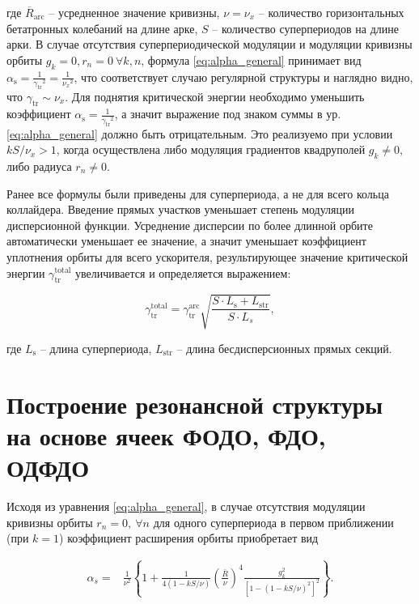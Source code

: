 \noindent где ${\overline{R}}_{\text{arc}}$ -- усредненное значение кривизны, $\nu=\nu_{x}$ -- количество горизонтальных бетатронных колебаний на длине арке, $S$ -- количество суперпериодов на длине арки. В случае отсутствия суперпериодической модуляции и модуляции кривизны орбиты $g_k=0, r_n=0 \  \forall k,n$, формула \ref{eq:alpha_general} принимает вид $\alpha_{\text{s}}=\frac{1}{{\gamma_{\text{tr}}}^2}=\frac{1}{{\nu_x}^2}$, что соответствует случаю регулярной структуры и наглядно видно, что  $\gamma_{\text{tr}}\sim\nu_x$. Для поднятия критической энергии необходимо уменьшить коэффициент $\alpha_{\text{s}}=\frac{1}{{\gamma_{\text{tr}}}^2}$, а значит выражение под знаком суммы в ур.\ref{eq:alpha_general} должно быть отрицательным. Это реализуемо при условии $kS/\nu_{x}>1$, когда осуществлена либо модуляция градиентов квадруполей $g_k\not=0$, либо радиуса $r_n\not=0$.

\par Ранее все формулы были приведены для суперпериода, а не для всего кольца коллайдера. Введение прямых участков уменьшает степень модуляции дисперсионной функции. Усреднение дисперсии по более длинной орбите автоматически уменьшает ее значение, а значит уменьшает коэффициент уплотнения орбиты для всего ускорителя, результирующее значение критической энергии $\gamma_{\text{tr}}^{\text{total}}$ увеличивается и определяется выражением:

\begin{equation}
\gamma_{\text{tr}}^{\text{total}}=\gamma_{\text{tr}}^{\text{arc}}\sqrt{\frac{S\cdot L_{\text{s}}+L_{\text{str}}}{S\cdot L_s}},
\label {eq:gamma_tr_modulated}
\end{equation}

\noindent где $L_{\text{s}}$ -- длина суперпериода, $L_{\text{str}}$ -- длина бесдисперсионных прямых секций.

	\section{Построение резонансной структуры на основе ячеек ФОДО, ФДО, ОДФДО}\label{sec:transition_variation/methods/FODO_FDO}

Исходя из уравнения \ref{eq:alpha_general}, в случае отсутствия модуляции кривизны орбиты $r_n=0, \ \forall n$ для одного суперпериода в первом приближении (при $k=1$) коэффициент расширения орбиты приобретает вид
	
\begin{equation}
\begin{aligned}
\alpha_s= & \frac{1}{\nu^2}\left\{1+\frac{1}{4(1-k S / \nu)}\left(\frac{\bar{R}}{\nu}\right)^4 \frac{g_k^2}{\left[1-(1-k S / \nu)^2\right]^2}\right\}.
\end{aligned}
\label{eq:alpha_gradient}
\end{equation}

